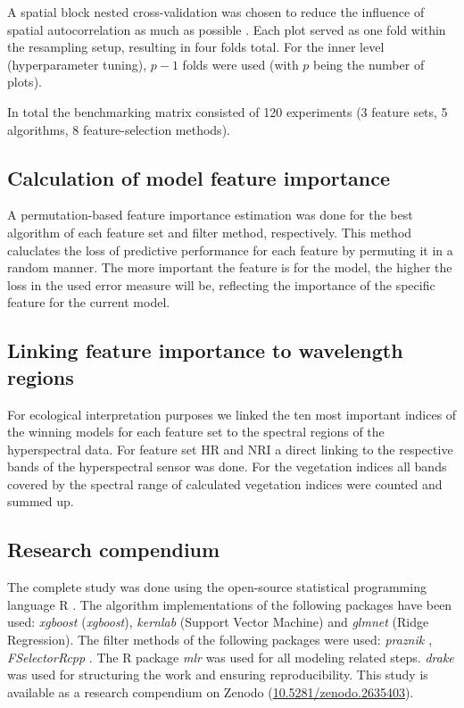\documentclass[letterpaper, journal]{IEEEtran}
\begin{document}
\noindent A spatial block nested cross-validation was chosen to reduce the influence of spatial autocorrelation as much as possible \cite{schratz2019, sperrorest}.
Each plot served as one fold within the resampling setup, resulting in four folds total.
For the inner level (hyperparameter tuning), $p - 1$ folds were used (with $p$ being the number of plots).

In total the benchmarking matrix consisted of 120 experiments (3 feature sets, 5 algorithms, 8 feature-selection methods).

\subsection{Calculation of model feature importance}
\noindent A permutation-based feature importance estimation was done for the best algorithm of each feature set and filter method, respectively.
This method caluclates the loss of predictive performance for each feature by permuting it in a random manner.
The more important the feature is for the model, the higher the loss in the used error measure will be, reflecting the importance of the specific feature for the current model.

\subsection{Linking feature importance to wavelength regions}
\noindent For ecological interpretation purposes we linked the ten most important indices of the winning models for each feature set to the spectral regions of the hyperspectral data.
For feature set HR and NRI a direct linking to the respective bands of the hyperspectral sensor was done.
For the vegetation indices all bands covered by the spectral range of calculated vegetation indices were counted and summed up.

\subsection{Research compendium}

\noindent The complete study was done using the open-source statistical programming language R \cite{rcoreteam2018}.
The algorithm implementations of the following packages have been used: \textit{xgboost} \cite{chen2016} (\textit{xgboost}), \textit{kernlab} \cite{kernlab} (Support Vector Machine) and \textit{glmnet} \cite{glmnet} (Ridge Regression).
The filter methods of the following packages were used: \textit{praznik \cite{praznik}}, \textit{FSelectorRcpp} \cite{fselectorrcpp}.
The R package \textit{mlr} \cite{mlr} was used for all modeling related steps.
\textit{drake} was used for structuring the work and ensuring reproducibility.
This study is available as a research compendium on Zenodo (\url{10.5281/zenodo.2635403}).
\end{document}
